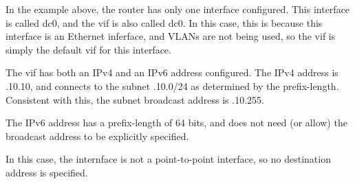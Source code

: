 \vspace{0.1in}
\noindent{}

\vspace{0.1in}
In the example above, the router has only one interface configured.
This interface is called {\stt dc0}, and the vif is also called {\stt
dc0}.  In this case, this is because this interface is an Ethernet
inferface, and VLANs are not being used, so the vif is simply the
default vif for this interface.  

The vif has both an IPv4 and an IPv6 address configured.  The IPv4
address is {.10.10}, and connects to the subnet {.10.0/24} as determined by the prefix-length.  Consistent with
this, the subnet broadcast address is {.10.255}.

The IPv6 address has a prefix-length of 64 bits, and does not need (or
allow) the broadcast address to be explicitly specified.  

In this case, the internface is not a point-to-point interface, so no
destination address is specified.


